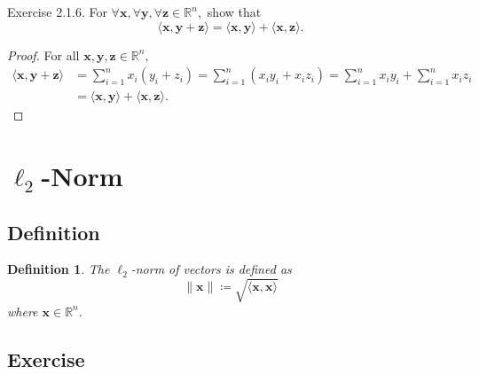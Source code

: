 \documentclass{article}
\theoremstyle{plain}
\newtheorem{dfn}{Definition}[subsection]
\begin{document}
\begin{itembox}[l]{Exercise 2.1.6.}
  For
  \begin{math}
    \forall \bm{x} , \forall \bm{y} , \forall \bm{z} \in \mathbb{R}^n ,
  \end{math}
  show that
  \begin{equation}
    \label{ex216}
    \langle \bm{x} , \bm{y} + \bm{z} \rangle = \langle \bm{x} , \bm{y} \rangle + \langle \bm{x} , \bm{z} \rangle .
  \end{equation}
\end{itembox}

\begin{proof}
  For all
  \begin{math}
    \bm{x} , \bm{y} , \bm{z} \in \mathbb{R}^n ,
  \end{math}
  \begin{equation*}
    \begin{split}
      \langle \bm{x} , \bm{y} + \bm{z} \rangle &= \sum_{i=1}^n x_i (y_i + z_i) = \sum_{i=1}^n (x_i y_i + x_i z_i) = \sum_{i=1}^n x_i y_i + \sum_{i=1}^n x_i z_i \\
      &= \langle \bm{x} , \bm{y} \rangle + \langle \bm{x} , \bm{z} \rangle .
    \end{split}
  \end{equation*}
\end{proof}



\section{$\ell_2$-Norm}

\subsection{Definition}

\begin{dfn}
  The $\ell_2$-norm of vectors is defined as
  \begin{equation}
    \label{def_norm}
    \lVert \bm{x} \rVert \coloneq \sqrt{\langle \bm{x} , \bm{x} \rangle}
  \end{equation}
  where
  \begin{math}
    \bm{x} \in \mathbb{R}^n.
  \end{math}
\end{dfn}

\subsection{Exercise}
\end{document}
